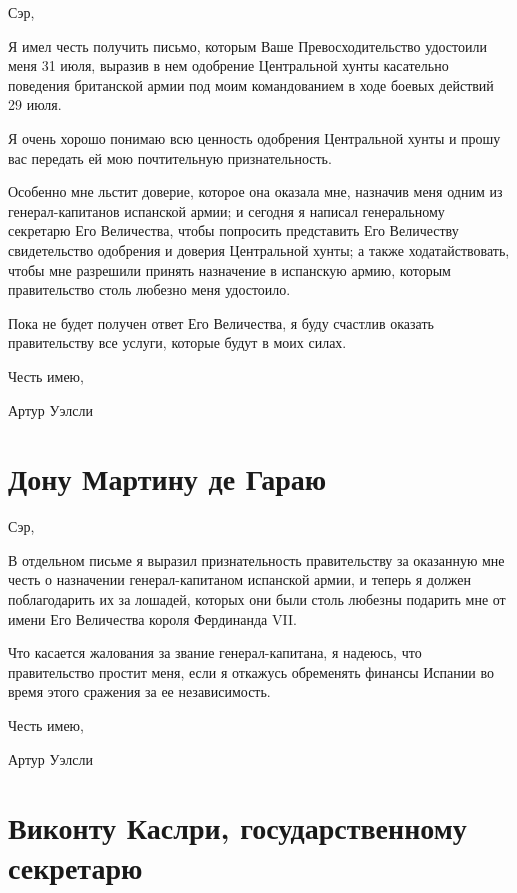 \documentclass[
  oneside,
  12pt,
  titlepage]{book}
\begin{document}
Сэр,

Я имел честь получить письмо, которым Ваше Превосходительство удостоили меня 31 июля, выразив в нем одобрение Центральной хунты касательно поведения британской армии под моим командованием в ходе боевых действий 29 июля.

Я очень хорошо понимаю всю ценность одобрения Центральной хунты и прошу вас передать ей мою почтительную признательность.

Особенно мне льстит доверие, которое она оказала мне, назначив меня одним из генерал-капитанов испанской армии; и сегодня я написал генеральному секретарю Его Величества, чтобы попросить представить Его Величеству свидетельство одобрения и доверия Центральной хунты; а также ходатайствовать, чтобы мне разрешили принять назначение в испанскую армию, которым правительство столь любезно меня удостоило.

Пока не будет получен ответ Его Величества, я буду счастлив оказать правительству все услуги, которые будут в моих силах.

Честь имею,

Артур Уэлсли

\hypertarget{ux434ux43eux43dux443-ux43cux430ux440ux442ux438ux43dux443-ux434ux435-ux433ux430ux440ux430ux44e-1}{%
\chapter{Дону Мартину де Гараю}\label{ux434ux43eux43dux443-ux43cux430ux440ux442ux438ux43dux443-ux434ux435-ux433ux430ux440ux430ux44e-1}}

Сэр,

В отдельном письме я выразил признательность правительству за оказанную мне честь о назначении генерал-капитаном испанской армии, и теперь я должен поблагодарить их за лошадей, которых они были столь любезны подарить мне от имени Его Величества короля Фердинанда VII.

Что касается жалования за звание генерал-капитана, я надеюсь, что правительство простит меня, если я откажусь обременять финансы Испании во время этого сражения за ее независимость.

Честь имею,

Артур Уэлсли

\hypertarget{ux432ux438ux43aux43eux43dux442ux443-ux43aux430ux441ux43bux440ux438-ux433ux43eux441ux443ux434ux430ux440ux441ux442ux432ux435ux43dux43dux43eux43cux443-ux441ux435ux43aux440ux435ux442ux430ux440ux44e}{%
\chapter{Виконту Каслри, государственному секретарю}\label{ux432ux438ux43aux43eux43dux442ux443-ux43aux430ux441ux43bux440ux438-ux433ux43eux441ux443ux434ux430ux440ux441ux442ux432ux435ux43dux43dux43eux43cux443-ux441ux435ux43aux440ux435ux442ux430ux440ux44e}}
\end{document}

